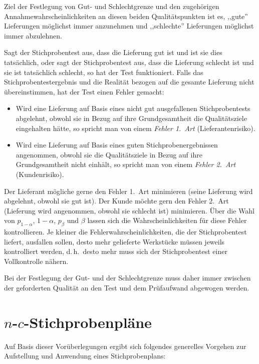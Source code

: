 \documentclass[a4paper,11pt,oneside]{article}
\begin{document}
Ziel der Festlegung von Gut- und Schlechtgrenze und den zugehörigen Annahmewahrscheinlichkeiten an diesen beiden Qualitätspunkten ist es, ,,gute'' Lieferungen möglichst immer anzunehmen und ,,schlechte'' Lieferungen möglichst immer abzulehnen.

Sagt der Stichprobentest aus, dass die Lieferung gut ist und ist sie dies tatsächlich, oder sagt der Stichprobentest aus, dass die Lieferung schlecht ist und sie ist tatsächlich schlecht, so hat der Test funktioniert. Falls das Stichprobentestergebnis und die Realität bezogen auf die gesamte Lieferung nicht übereinstimmen, hat der Test einen Fehler gemacht:

\begin{itemize}
\item
Wird eine Lieferung auf Basis eines nicht gut ausgefallenen Stichprobentests abgelehnt, obwohl sie in Bezug auf ihre Grundgesamtheit die Qualitätsziele eingehalten hätte, so spricht man von einem \emph{Fehler 1.\ Art} (Lieferantenrisiko).
\item
Wird eine Lieferung auf Basis eines guten Stichprobenergebnissen angenommen, obwohl sie die Qualitätsziele in Bezug auf ihre Grundgesamtheit nicht einhält, so spricht man von einem \emph{Fehler 2.\ Art} (Kundenrisiko).
\end{itemize}

Der Lieferant mögliche gerne den Fehler 1.\ Art minimieren (seine Lieferung wird abgelehnt, obwohl sie gut ist). Der Kunde möchte gern den Fehler 2.\ Art (Lieferung wird angenommen, obwohl sie schlecht ist) minimieren. Über die Wahl von $p_{1-\alpha}$, $1-\alpha$, $p_\beta$ und $\beta$ lassen sich die Wahrscheinlichkeiten für diese Fehler kontrollieren. Je kleiner die Fehlerwahrscheinlichkeiten, die der Stichprobentest liefert, ausfallen sollen, desto mehr gelieferte Werkstücke müssen jeweils kontrolliert werden, d.\,h.\ desto mehr muss sich der Stichprobentest einer Vollkontrolle nähern.

Bei der Festlegung der Gut- und der Schlechtgrenze muss daher immer zwischen der geforderten Qualität an den Test und dem Prüfaufwand abgewogen werden.



\section[n-c-Stichprobenpläne]{$n$-$c$-Stichprobenpläne}

Auf Basis dieser Vorüberlegungen ergibt sich folgendes generelles Vorgehen zur Aufstellung und Anwendung eines Stichprobenplans:
\end{document}
